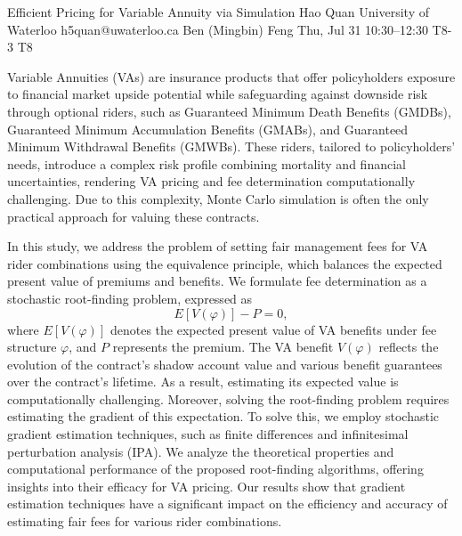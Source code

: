 \begin{talk}
  {Efficient Pricing for Variable Annuity via Simulation}%
  {Hao Quan}%
  {University of Waterloo}%
  {h5quan@uwaterloo.ca}%
  {Ben (Mingbin) Feng}%
  {}%
  {Thu, Jul 31 10:30–12:30}%
  {T8-3}%
  {T8}%
  
				

Variable Annuities (VAs) are insurance products that offer policyholders exposure to financial market upside potential while safeguarding against downside risk through optional riders, such as Guaranteed Minimum Death Benefits (GMDBs), Guaranteed Minimum Accumulation Benefits (GMABs), and Guaranteed Minimum Withdrawal Benefits (GMWBs). These riders, tailored to policyholders’ needs, introduce a complex risk profile combining mortality and financial uncertainties, rendering VA pricing and fee determination computationally challenging. Due to this complexity, Monte Carlo simulation is often the only practical approach for valuing these contracts.

In this study, we address the problem of setting fair management fees for VA rider combinations using the equivalence principle, which balances the expected present value of premiums and benefits. We formulate fee determination as a stochastic root-finding problem, expressed as
\[
E[V(\varphi)] - P = 0,
\]
where \( E[V(\varphi)] \) denotes the expected present value of VA benefits under fee structure \( \varphi \), and \( P \) represents the premium. The VA benefit \( V(\varphi) \) reflects the evolution of the contract’s shadow account value and various benefit guarantees over the contract’s lifetime. As a result, estimating its expected value is computationally challenging. Moreover, solving the root-finding problem requires estimating the gradient of this expectation. To solve this, we employ stochastic gradient estimation techniques, such as finite differences and infinitesimal perturbation analysis (IPA). We analyze the theoretical properties and computational performance of the proposed root-finding algorithms, offering insights into their efficacy for VA pricing. Our results show that gradient estimation techniques have a significant impact on the efficiency and accuracy of estimating fair fees for various rider combinations.
\end{talk}

